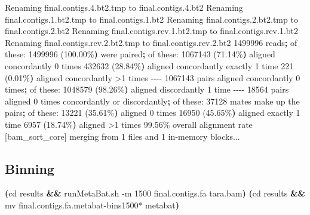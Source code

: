 \documentclass[
  letterpaper,
  DIV=11,
  numbers=noendperiod]{scrartcl}
\newenvironment{Shaded}{\begin{snugshade}}{\end{snugshade}}
\newcommand{\AttributeTok}[1]{\textcolor[rgb]{0.40,0.45,0.13}{#1}}
\newcommand{\BuiltInTok}[1]{\textcolor[rgb]{0.00,0.23,0.31}{#1}}
\newcommand{\ErrorTok}[1]{\textcolor[rgb]{0.68,0.00,0.00}{#1}}
\newcommand{\ExtensionTok}[1]{\textcolor[rgb]{0.00,0.23,0.31}{#1}}
\newcommand{\FunctionTok}[1]{\textcolor[rgb]{0.28,0.35,0.67}{#1}}
\newcommand{\KeywordTok}[1]{\textcolor[rgb]{0.00,0.23,0.31}{\textbf{#1}}}
\newcommand{\NormalTok}[1]{\textcolor[rgb]{0.00,0.23,0.31}{#1}}
\newcommand{\OperatorTok}[1]{\textcolor[rgb]{0.37,0.37,0.37}{#1}}
\newcommand{\PreprocessorTok}[1]{\textcolor[rgb]{0.68,0.00,0.00}{#1}}
\begin{document}
\begin{Shaded}
\begin{Highlighting}[]
\ExtensionTok{Renaming}\NormalTok{ final.contigs.4.bt2.tmp to final.contigs.4.bt2}
\ExtensionTok{Renaming}\NormalTok{ final.contigs.1.bt2.tmp to final.contigs.1.bt2}
\ExtensionTok{Renaming}\NormalTok{ final.contigs.2.bt2.tmp to final.contigs.2.bt2}
\ExtensionTok{Renaming}\NormalTok{ final.contigs.rev.1.bt2.tmp to final.contigs.rev.1.bt2}
\ExtensionTok{Renaming}\NormalTok{ final.contigs.rev.2.bt2.tmp to final.contigs.rev.2.bt2}
\ExtensionTok{1499996}\NormalTok{ reads}\KeywordTok{;} \ExtensionTok{of}\NormalTok{ these:}
  \ExtensionTok{1499996} \ErrorTok{(}\ExtensionTok{100.00\%}\KeywordTok{)} \ExtensionTok{were}\NormalTok{ paired}\KeywordTok{;} \ExtensionTok{of}\NormalTok{ these:}
    \ExtensionTok{1067143} \ErrorTok{(}\ExtensionTok{71.14\%}\KeywordTok{)} \ExtensionTok{aligned}\NormalTok{ concordantly 0 times}
    \ExtensionTok{432632} \ErrorTok{(}\ExtensionTok{28.84\%}\KeywordTok{)} \ExtensionTok{aligned}\NormalTok{ concordantly exactly 1 time}
    \ExtensionTok{221} \ErrorTok{(}\ExtensionTok{0.01\%}\KeywordTok{)} \ExtensionTok{aligned}\NormalTok{ concordantly }\OperatorTok{\textgreater{}}\NormalTok{1 times}
    \ExtensionTok{{-}{-}{-}{-}}
    \ExtensionTok{1067143}\NormalTok{ pairs aligned concordantly 0 times}\KeywordTok{;} \ExtensionTok{of}\NormalTok{ these:}
      \ExtensionTok{1048579} \ErrorTok{(}\ExtensionTok{98.26\%}\KeywordTok{)} \ExtensionTok{aligned}\NormalTok{ discordantly 1 time}
    \ExtensionTok{{-}{-}{-}{-}}
    \ExtensionTok{18564}\NormalTok{ pairs aligned 0 times concordantly or discordantly}\KeywordTok{;} \ExtensionTok{of}\NormalTok{ these:}
      \ExtensionTok{37128}\NormalTok{ mates make up the pairs}\KeywordTok{;} \ExtensionTok{of}\NormalTok{ these:}
        \ExtensionTok{13221} \ErrorTok{(}\ExtensionTok{35.61\%}\KeywordTok{)} \ExtensionTok{aligned}\NormalTok{ 0 times}
        \ExtensionTok{16950} \ErrorTok{(}\ExtensionTok{45.65\%}\KeywordTok{)} \ExtensionTok{aligned}\NormalTok{ exactly 1 time}
        \ExtensionTok{6957} \ErrorTok{(}\ExtensionTok{18.74\%}\KeywordTok{)} \ExtensionTok{aligned} \OperatorTok{\textgreater{}}\NormalTok{1 times}
\ExtensionTok{99.56\%}\NormalTok{ overall alignment rate}
\ExtensionTok{[bam\_sort\_core]}\NormalTok{ merging from 1 files and 1 in{-}memory blocks...}
\end{Highlighting}
\end{Shaded}

\subsection{Binning}\label{binning}

\begin{Shaded}
\begin{Highlighting}[]
\KeywordTok{(}\BuiltInTok{cd}\NormalTok{ results }\KeywordTok{\&\&} \ExtensionTok{runMetaBat.sh} \AttributeTok{{-}m}\NormalTok{ 1500 final.contigs.fa tara.bam}\KeywordTok{)}
\KeywordTok{(}\BuiltInTok{cd}\NormalTok{ results }\KeywordTok{\&\&} \FunctionTok{mv}\NormalTok{ final.contigs.fa.metabat{-}bins1500}\PreprocessorTok{*}\NormalTok{ metabat}\KeywordTok{)}
\end{Highlighting}
\end{Shaded}
\end{document}
